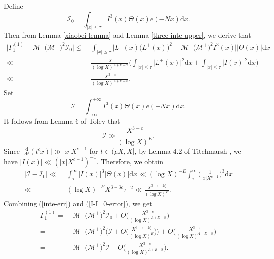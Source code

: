 \documentclass[a4paper,oneside,11pt]{article}%
\numberwithin{equation}{section}
\begin{document}
Define
\begin{equation*}
  \mathcal{I}_0=\int_{|x|\leqslant\tau}I^3(x)\Theta(x)e(-Nx)\mathrm{d}x.
\end{equation*}
Then from Lemma \ref{xiaobei-lemma} and Lemma \ref{three-inte-upper}, we derive that
\begin{align}\label{inte-err}
                 \Big|\Gamma_1^{(1)}-\mathcal{M}^-\big(\mathcal{M}^+\big)^2\mathcal{I}_0\Big|
\leqslant & \,\, \int_{|x|\leqslant\tau}\Big|L^-(x)\big(L^+(x)\big)^2-\mathcal{M}^-\big(\mathcal{M}^+\big)^2I^3(x)\Big|
                 \big|\Theta(x)\big|\mathrm{d}x
                        \nonumber \\
\ll & \,\, \frac{X}{(\log X)^{A+E-2}}\Bigg(\int_{|x|\leqslant\tau} \big|L^+(x)\big|^2\mathrm{d}x
           +\int_{|x|\leqslant\tau}\big|I(x)\big|^2\mathrm{d}x\Bigg)
                        \nonumber \\
\ll & \,\, \frac{X^{3-c}}{(\log X)^{A+E-8}}.
\end{align}
Set
\begin{equation*}
  \mathcal{I}=\int_{-\infty}^{+\infty}I^3(x)\Theta(x)e(-Nx)\mathrm{d}x.
\end{equation*}
It follows from Lemma 6 of Tolev \cite{Tolev-1992} that
\begin{equation}\label{singular-I-lower}
  \mathcal{I}\gg\frac{X^{3-c}}{(\log X)^{E}}.
\end{equation}
Since $\big|\frac{\mathrm{d}}{\mathrm{d}t}(t^cx)\big|\gg|x|X^{c-1}$ for $t\in(\mu X,X]$, by Lemma 4.2 of Titchmarsh
\cite{Titchmarsh-book}, we have $|I(x)|\ll (|x|X^{c-1})^{-1}$. Therefore, we obtain
\begin{align}\label{I-I_0-error}
     \big|\mathcal{I}-\mathcal{I}_0\big|
\ll & \,\, \int_{\tau}^{\infty}\big|I(x)\big|^3\big|\Theta(x)\big|\mathrm{d}x\ll(\log X)^{-E}\int_{\tau}^{\infty}
           \bigg(\frac{1}{|x|X^{c-1}}\bigg)^3\mathrm{d}x
                \nonumber \\
\ll & \,\, (\log X)^{-E}X^{3-3c}\tau^{-2}\ll\frac{X^{3-c-2\xi}}{(\log X)^E}.
\end{align}
Combining (\ref{inte-err}) and (\ref{I-I_0-error}), we get
\begin{align}\label{main-substi-1}
          \Gamma_1^{(1)}
 = & \,\, \mathcal{M}^-\big(\mathcal{M}^+\big)^2\mathcal{I}_0+O\bigg(\frac{X^{3-c}}{(\log X)^{A+E-8}}\bigg)
                  \nonumber \\
 = & \,\, \mathcal{M}^-\big(\mathcal{M}^+\big)^2\bigg(\mathcal{I}+O\bigg(\frac{X^{3-c-2\xi}}{(\log X)^E}\bigg)\bigg)
          +O\bigg(\frac{X^{3-c}}{(\log X)^{A+E-8}}\bigg)
                  \nonumber \\
 = & \,\, \mathcal{M}^-\big(\mathcal{M}^+\big)^2\mathcal{I}+O\bigg(\frac{X^{3-c}}{(\log X)^{A+E-8}}\bigg).
\end{align}
\end{document}
